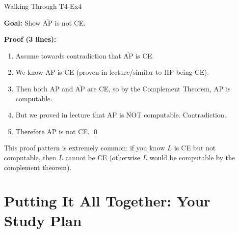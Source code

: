 \documentclass[11pt,a4paper]{article}
\newcommand{\keytakeaway}[1]{%
  \par\vspace{0.3em}%
  \colorbox{yellow!60}{\parbox{\dimexpr\linewidth-2\fboxsep}{#1}}%
  \vspace{0.3em}}
\begin{document}
\begin{examplebox}{Walking Through T4-Ex4}

\textbf{Goal:} Show $\overline{\text{AP}}$ is not CE.

\textbf{Proof (3 lines):}
\begin{enumerate}
    \item Assume towards contradiction that $\overline{\text{AP}}$ is CE.
    \item We know AP is CE (proven in lecture/similar to HP being CE).
    \item Then both AP and $\overline{\text{AP}}$ are CE, so by the Complement Theorem, AP is computable.
    \item But we proved in lecture that AP is NOT computable. Contradiction.
    \item Therefore $\overline{\text{AP}}$ is not CE. \qed
\end{enumerate}

\keytakeaway{This proof pattern is extremely common: if you know $L$ is CE but not computable, then $\overline{L}$ cannot be CE (otherwise $L$ would be computable by the complement theorem).}
\end{examplebox}

\newpage
\section{Putting It All Together: Your Study Plan}
\end{document}
